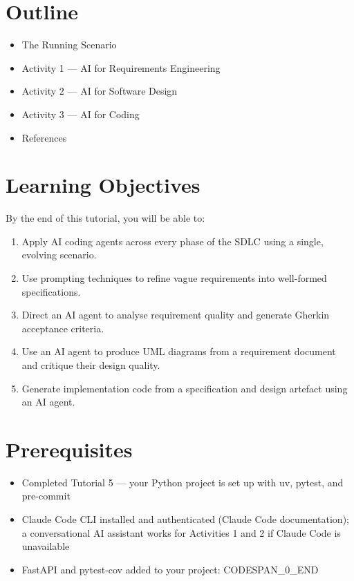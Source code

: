 \documentclass[11pt,a4paper]{book}
\begin{document}
\section{Outline}

\begin{itemize}
  \item The Running Scenario
  \item Activity 1 --- AI for Requirements Engineering
  \item Activity 2 --- AI for Software Design
  \item Activity 3 --- AI for Coding
  \item References
\end{itemize}

\medskip

\section{Learning Objectives}

By the end of this tutorial, you will be able to:

\begin{enumerate}
  \item Apply AI coding agents across every phase of the SDLC using a single, evolving scenario.
  \item Use prompting techniques to refine vague requirements into well-formed specifications.
  \item Direct an AI agent to analyse requirement quality and generate Gherkin acceptance criteria.
  \item Use an AI agent to produce UML diagrams from a requirement document and critique their design quality.
  \item Generate implementation code from a specification and design artefact using an AI agent.
\end{enumerate}

\medskip

\section{Prerequisites}

\begin{itemize}
  \item Completed Tutorial 5 --- your Python project is set up with uv, pytest, and pre-commit
  \item Claude Code CLI installed and authenticated (Claude Code documentation); a conversational AI assistant works for Activities 1 and 2 if Claude Code is unavailable
  \item FastAPI and pytest-cov added to your project: CODESPAN\_0\_END
\end{itemize}
\end{document}
